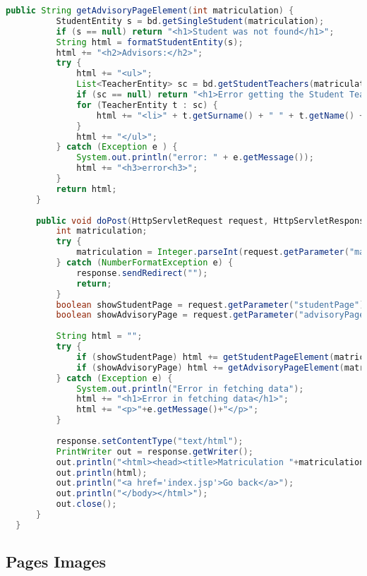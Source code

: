 \begin{lstlisting}[language=java, caption={SearchMatriculationServlet}]
      public String getAdvisoryPageElement(int matriculation) {
          StudentEntity s = bd.getSingleStudent(matriculation);
          if (s == null) return "<h1>Student was not found</h1>";
          String html = formatStudentEntity(s);
          html += "<h2>Advisors:</h2>";
          try {
              html += "<ul>";
              List<TeacherEntity> sc = bd.getStudentTeachers(matriculation);
              if (sc == null) return "<h1>Error getting the Student Teachers</h1>";
              for (TeacherEntity t : sc) {
                  html += "<li>" + t.getSurname() + " " + t.getName() + "</li>";
              }
              html += "</ul>";
          } catch (Exception e ) {
              System.out.println("error: " + e.getMessage());
              html += "<h3>error<h3>";
          }
          return html;
      }
  
      public void doPost(HttpServletRequest request, HttpServletResponse response) throws IOException {
          int matriculation;
          try {
              matriculation = Integer.parseInt(request.getParameter("matriculation"));
          } catch (NumberFormatException e) {
              response.sendRedirect("");
              return;
          }
          boolean showStudentPage = request.getParameter("studentPage") != null;
          boolean showAdvisoryPage = request.getParameter("advisoryPage") != null;
  
          String html = "";
          try {
              if (showStudentPage) html += getStudentPageElement(matriculation);
              if (showAdvisoryPage) html += getAdvisoryPageElement(matriculation);
          } catch (Exception e) {
              System.out.println("Error in fetching data");
              html += "<h1>Error in fetching data</h1>";
              html += "<p>"+e.getMessage()+"</p>";
          }
  
          response.setContentType("text/html");
          PrintWriter out = response.getWriter();
          out.println("<html><head><title>Matriculation "+matriculation+"</title></head><body>");
          out.println(html);
          out.println("<a href='index.jsp'>Go back</a>");
          out.println("</body></html>");
          out.close();
      }
  }
\end{lstlisting}

\pagebreak
\subsection{Pages Images}

